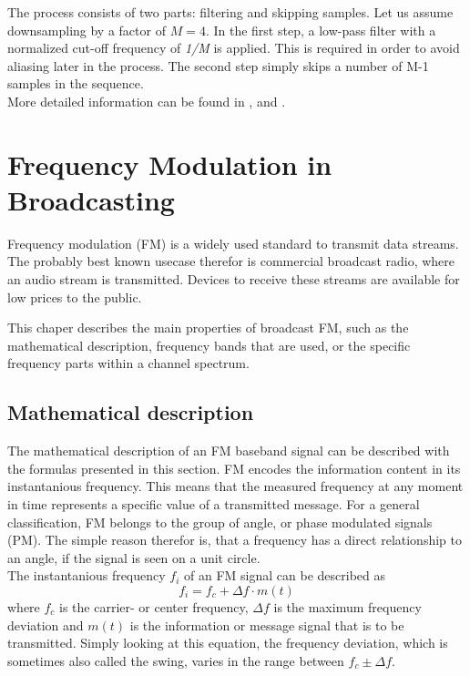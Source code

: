 The process consists of two parts: filtering and skipping samples.
Let us assume downsampling by a factor of $M=4$.
In the first step, a low-pass filter with a normalized cut-off frequency of \textit{1/M} is applied.
This is required in order to avoid aliasing later in the process.
The second step simply skips a number of M-1 samples in the sequence.\\

More detailed information can be found in \cite[chpt. 6.9]{AlessioSilviaMaria2016DSPa}, \cite[chpt. 4.1]{GopiE.S2018MDSP} and \cite[chpt. 10.2.2]{ThyagarajanK.S2019ItDS}.

\section{Frequency Modulation in Broadcasting}

Frequency modulation (FM) is a widely used standard to transmit data streams.
The probably best known usecase therefor is commercial broadcast radio, where an audio stream is transmitted.
Devices to receive these streams are available for low prices to the public.

This chaper describes the main properties of broadcast FM, such as the mathematical description, frequency bands that are used, or the specific frequency parts within a channel spectrum.

\subsection{Mathematical description}

The mathematical description of an FM baseband signal can be described with the formulas presented in this section.
FM encodes the information content in its instantanious frequency.
This means that the measured frequency at any moment in time represents a specific value of a transmitted message.
For a general classification, FM belongs to the group of angle, or phase modulated signals (PM).
The simple reason therefor is, that a frequency has a direct relationship to an angle, if the signal is seen on a unit circle.\\

The instantanious frequency $f_i$ of an FM signal can be described as
\begin{equation}
  f_i = f_c + \Delta f \cdot m(t)
\end{equation}
where $f_c$ is the carrier- or center frequency, $\Delta f$ is the maximum frequency deviation and $m(t)$ is the information or message signal that is to be transmitted.
Simply looking at this equation, the frequency deviation, which is sometimes also called the swing, varies in the range between $f_c \pm \Delta f$.

